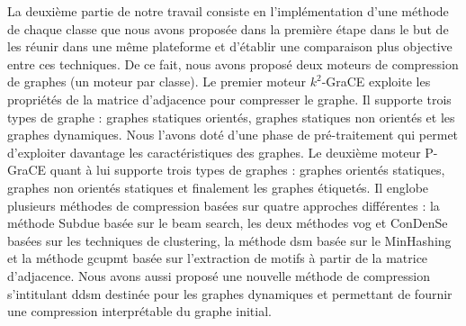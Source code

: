 \documentclass[a4paper,oneside,12pt]{report}
\theoremstyle{definition}
\begin{document}
La deuxième partie de notre travail consiste en l'implémentation d'une méthode de chaque classe que nous avons proposée dans la première étape dans le but de les réunir dans une même plateforme et d'établir une comparaison plus objective entre ces techniques. De ce fait, nous avons proposé deux moteurs de compression de graphes (un moteur par classe). Le premier moteur $k^2$-GraCE exploite les propriétés de la matrice d'adjacence pour compresser le graphe. Il supporte trois types de graphe : graphes statiques orientés, graphes statiques non orientés et les graphes dynamiques. Nous l'avons doté d'une phase de pré-traitement qui permet d'exploiter davantage les caractéristiques des graphes. Le deuxième moteur P-GraCE quant à lui supporte trois types de graphes : graphes orientés statiques, graphes non orientés statiques et finalement les graphes étiquetés. Il englobe plusieurs méthodes de compression basées sur quatre approches différentes : la méthode Subdue basée sur le beam search, les deux méthodes \gls{vog} et \gls{ConDenSe} basées sur les techniques de clustering, la méthode \gls{dsm} basée sur le MinHashing et la méthode \gls{gcupmt} basée sur l'extraction de motifs à partir de la matrice d'adjacence. Nous avons aussi proposé une nouvelle méthode de compression s'intitulant \gls{ddsm} destinée pour les graphes dynamiques et permettant de fournir une compression interprétable du graphe initial. \\
\end{document}
